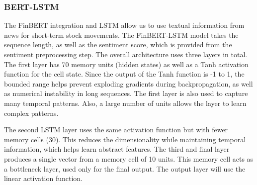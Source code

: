 \documentclass[12pt]{article}
\begin{document}
\subsubsection*{BERT-LSTM}

The FinBERT integration and LSTM allow us to use textual information from news for short-term stock movements. The FinBERT-LSTM model takes the sequence length, as well as the sentiment score, which is provided from the sentiment preprocessing step. The overall architecture uses three layers in total. The first layer has 70 memory units (hidden states) as well as a Tanh activation function for the cell state. Since the output of the Tanh function is -1 to 1, the bounded range helps prevent exploding gradients during backpropagation, as well as numerical instability in long sequences. The first layer is also used to capture many temporal patterns. Also, a large number of units allows the layer to learn complex patterns.

The second LSTM layer uses the same activation function but with fewer memory cells (30). This reduces the dimensionality while maintaining temporal information, which helps learn abstract features. The third and final layer produces a single vector from a memory cell of 10 units. This memory cell acts as a bottleneck layer, used only for the final output. The output layer will use the linear activation function.
\end{document}
